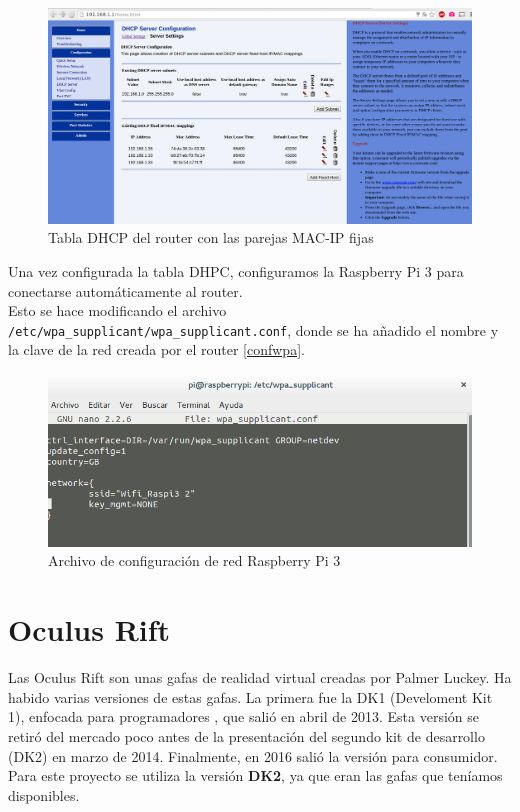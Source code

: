 \documentclass[twoside, 11pt]{epstfg}
\begin{document}
\begin{figure}[H]
	\centerline{
		\mbox{\includegraphics[width=.95\textwidth]{images/TablaDHCP2.png}}
	}
	\caption{Tabla DHCP del router con las parejas MAC-IP fijas}
\end{figure}\label{Tabla DHPC}

Una vez configurada la tabla DHPC, configuramos la Raspberry Pi 3 para conectarse automáticamente al router.\\
Esto se hace modificando el archivo \texttt{/etc/wpa\_supplicant/wpa\_supplicant.conf}, donde se ha añadido el nombre y la clave de la red creada por el router \ref{confwpa}. 

\begin{figure}[H]
	\centerline{
		\mbox{\includegraphics[width=.95\textwidth]{images/confRaspiWifi.png}}
	}
	\caption{Archivo de configuración de red Raspberry Pi 3}
\end{figure}\label{confwpa}
 
\newpage
\section{Oculus Rift}

Las Oculus Rift son unas gafas de realidad virtual creadas por Palmer Luckey.
Ha habido varias versiones de estas gafas.
La primera fue la DK1 (Develoment Kit 1), enfocada para programadores , que salió en abril de 2013. Esta versión se retiró del mercado poco antes de la presentación del segundo kit de desarrollo (DK2) en marzo de 2014.
Finalmente, en 2016 salió la versión para consumidor.\\
Para este proyecto se utiliza la versión \textbf{DK2}, ya que eran las gafas que teníamos disponibles.
\end{document}
